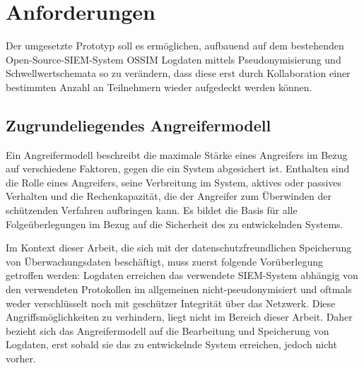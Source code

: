 \section{Anforderungen}

\label{sec_impl_requirements}

Der umgesetzte Prototyp soll es ermöglichen, aufbauend auf dem bestehenden Open-Source-SIEM-System OSSIM Logdaten mittels Pseudonymisierung und Schwellwertschemata so zu verändern, dass diese erst durch Kollaboration einer bestimmten Anzahl an Teilnehmern wieder aufgedeckt werden können.






\subsection*{Zugrundeliegendes Angreifermodell}


Ein Angreifermodell beschreibt die maximale Stärke eines Angreifers im Bezug auf verschiedene Faktoren, gegen die ein System abgesichert ist. Enthalten sind die Rolle eines Angreifers, seine Verbreitung im System, aktives oder passives Verhalten und die Rechenkapazität, die der Angreifer zum Überwinden der schützenden Verfahren aufbringen kann. Es bildet die Basis für alle Folgeüberlegungen im Bezug auf die Sicherheit des zu entwickelnden Systems.

Im Kontext dieser Arbeit, die sich mit der datenschutzfreundlichen Speicherung von Überwachungsdaten beschäftigt, muss zuerst folgende Vorüberlegung getroffen werden: Logdaten erreichen das verwendete SIEM-System abhängig von den verwendeten Protokollen im allgemeinen nicht-pseudonymisiert und oftmals weder verschlüsselt noch mit geschützer Integrität über das Netzwerk. 
Diese Angriffsmöglichkeiten zu verhindern, liegt nicht im Bereich dieser Arbeit. Daher bezieht sich das Angreifermodell auf die Bearbeitung und Speicherung von Logdaten, erst sobald sie das zu entwickelnde System erreichen, jedoch nicht vorher.

